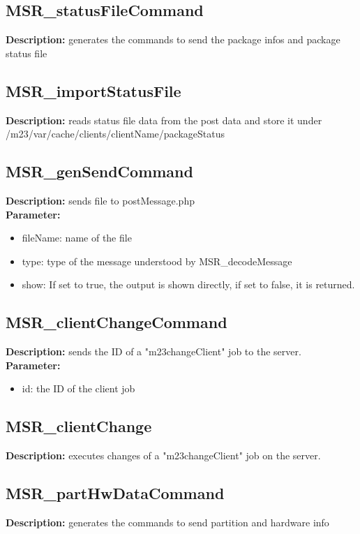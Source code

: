 \subsection{MSR\_statusFileCommand}
\textbf{Description:} generates the commands to send the package infos and package status file\\

\subsection{MSR\_importStatusFile}
\textbf{Description:} reads status file data from the post data and store it under /m23/var/cache/clients/clientName/packageStatus\\

\subsection{MSR\_genSendCommand}
\textbf{Description:} sends file to postMessage.php\\
\textbf{Parameter:}
\begin{itemize}
\item fileName: name of the file
\item type: type of the message understood by MSR\_decodeMessage
\item show: If set to true, the output is shown directly, if set to false, it is returned.
\end{itemize}

\subsection{MSR\_clientChangeCommand}
\textbf{Description:} sends the ID of a "m23changeClient" job to the server.\\
\textbf{Parameter:}
\begin{itemize}
\item id: the ID of the client job
\end{itemize}

\subsection{MSR\_clientChange}
\textbf{Description:} executes changes of a "m23changeClient" job on the server.\\

\subsection{MSR\_partHwDataCommand}
\textbf{Description:} generates the commands to send partition and hardware info\\

